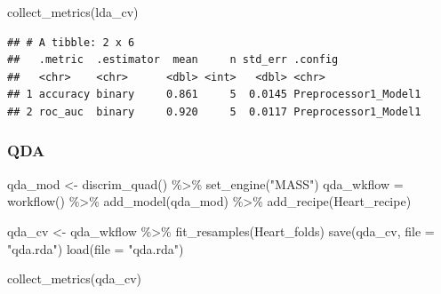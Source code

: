 \documentclass[
]{article}
\newenvironment{Shaded}{\begin{snugshade}}{\end{snugshade}}
\newcommand{\AttributeTok}[1]{\textcolor[rgb]{0.77,0.63,0.00}{#1}}
\newcommand{\FunctionTok}[1]{\textcolor[rgb]{0.00,0.00,0.00}{#1}}
\newcommand{\NormalTok}[1]{#1}
\newcommand{\OtherTok}[1]{\textcolor[rgb]{0.56,0.35,0.01}{#1}}
\newcommand{\SpecialCharTok}[1]{\textcolor[rgb]{0.00,0.00,0.00}{#1}}
\newcommand{\StringTok}[1]{\textcolor[rgb]{0.31,0.60,0.02}{#1}}
\begin{document}
\begin{Shaded}
\begin{Highlighting}[]
\FunctionTok{collect\_metrics}\NormalTok{(lda\_cv)}
\end{Highlighting}
\end{Shaded}

\begin{verbatim}
## # A tibble: 2 x 6
##   .metric  .estimator  mean     n std_err .config             
##   <chr>    <chr>      <dbl> <int>   <dbl> <chr>               
## 1 accuracy binary     0.861     5  0.0145 Preprocessor1_Model1
## 2 roc_auc  binary     0.920     5  0.0117 Preprocessor1_Model1
\end{verbatim}

\hypertarget{qda}{%
\subsubsection{QDA}\label{qda}}

\begin{Shaded}
\begin{Highlighting}[]
\NormalTok{qda\_mod }\OtherTok{\textless{}{-}} \FunctionTok{discrim\_quad}\NormalTok{() }\SpecialCharTok{\%\textgreater{}\%}
  \FunctionTok{set\_engine}\NormalTok{(}\StringTok{"MASS"}\NormalTok{)}
\NormalTok{qda\_wkflow }\OtherTok{=} \FunctionTok{workflow}\NormalTok{() }\SpecialCharTok{\%\textgreater{}\%}
  \FunctionTok{add\_model}\NormalTok{(qda\_mod) }\SpecialCharTok{\%\textgreater{}\%}
  \FunctionTok{add\_recipe}\NormalTok{(Heart\_recipe)}
\end{Highlighting}
\end{Shaded}

\begin{Shaded}
\begin{Highlighting}[]
\NormalTok{qda\_cv }\OtherTok{\textless{}{-}}\NormalTok{ qda\_wkflow }\SpecialCharTok{\%\textgreater{}\%}
  \FunctionTok{fit\_resamples}\NormalTok{(Heart\_folds)}
\FunctionTok{save}\NormalTok{(qda\_cv, }\AttributeTok{file =} \StringTok{"qda.rda"}\NormalTok{)}
\FunctionTok{load}\NormalTok{(}\AttributeTok{file =} \StringTok{"qda.rda"}\NormalTok{)}
\end{Highlighting}
\end{Shaded}

\begin{Shaded}
\begin{Highlighting}[]
\FunctionTok{collect\_metrics}\NormalTok{(qda\_cv)}
\end{Highlighting}
\end{Shaded}
\end{document}
